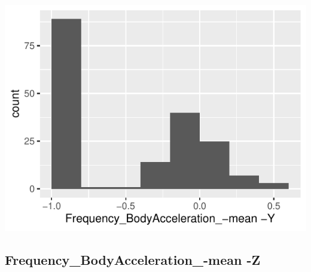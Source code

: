 \documentclass[
]{article}
\begin{document}
\begin{minipage}{0.25 \textwidth}

\includegraphics{codebook_tidydatasub_files/figure-latex/Var-44-Frequency-BodyAcceleration--mean--Y-1.pdf}

\end{minipage}

\noindent\makebox[\linewidth]{\rule{\textwidth}{0.4pt}}

\hypertarget{frequency_bodyacceleration_-mean--z}{%
\subsection{Frequency\_BodyAcceleration\_-mean
-Z}\label{frequency_bodyacceleration_-mean--z}}
\end{document}
